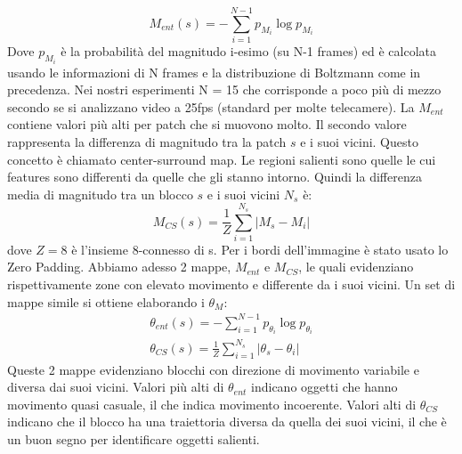 \documentclass[12pt,oneside]{IEEEtran}
\begin{document}
			\begin{equation}
			M_{ent}(s) = -\sum_{i=1}^{N-1}p_{M_i}\log p_{M_i}
			\end{equation}
			Dove $p_{M_i}$ è la probabilità del magnitudo i-esimo (su N-1 frames) ed è calcolata usando le informazioni di N frames e la distribuzione di Boltzmann come in precedenza.\newline
			Nei nostri esperimenti N = 15 che corrisponde a poco più di mezzo secondo se si analizzano video a 25fps (standard per molte telecamere).\newline
			La $M_{ent}$ contiene valori più alti per patch che si muovono molto. Il secondo valore rappresenta la differenza di magnitudo tra la patch $s$ e i suoi vicini. Questo concetto è chiamato center-surround map. Le regioni salienti sono quelle le cui features sono differenti da quelle che gli stanno intorno. Quindi la differenza media di magnitudo tra un blocco $s$ e i suoi vicini $N_s$ è:
			\begin{equation}
			M_{CS}(s) = \frac{1}{Z} \sum_{i=1}^{N_s}|M_s-M_i|
			\end{equation}
			dove $Z = 8$ è l'insieme 8-connesso di s. Per i bordi dell'immagine è stato usato lo Zero Padding.\newline
			Abbiamo adesso 2 mappe, $M_{ent}$ e $M_{CS}$, le quali evidenziano rispettivamente zone con elevato movimento e differente da i suoi vicini.\newline
			Un set di mappe simile si ottiene elaborando i $\theta_M$:
			\begin{equation}
			\begin{aligned}
				\theta_{ent}(s) = -\sum_{i=1}^{N-1}p_{\theta_i}\log p_{\theta_i} \\
				\theta_{CS}(s) = \frac{1}{Z} \sum_{i=1}^{N_s}|\theta_s-\theta_i|
			\end{aligned}
			\end{equation}
			Queste 2 mappe evidenziano blocchi con direzione di movimento variabile e diversa dai suoi vicini. Valori più alti di $\theta_{ent}$ indicano oggetti che hanno movimento quasi casuale, il che indica movimento incoerente. Valori alti di $\theta_{CS}$ indicano che il blocco ha una traiettoria diversa da quella dei suoi vicini, il che è un buon segno per identificare oggetti salienti.
\end{document}
